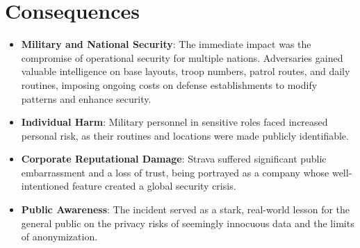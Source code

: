 \documentclass{article}
\begin{document}
\section{Consequences}
\begin{itemize}
    \item \textbf{Military and National Security}: The immediate impact was the compromise of operational security for multiple nations. Adversaries gained valuable intelligence on base layouts, troop numbers, patrol routes, and daily routines, imposing ongoing costs on defense establishments to modify patterns and enhance security.

\item \textbf{Individual Harm}: Military personnel in sensitive roles faced increased personal risk, as their routines and locations were made publicly identifiable.

\item \textbf{Corporate Reputational Damage}: Strava suffered significant public embarrassment and a loss of trust, being portrayed as a company whose well-intentioned feature created a global security crisis.

\item \textbf{ Public Awareness}: The incident served as a stark, real-world lesson for the general public on the privacy risks of seemingly innocuous data and the limits of anonymization.
\end{itemize}
\end{document}
